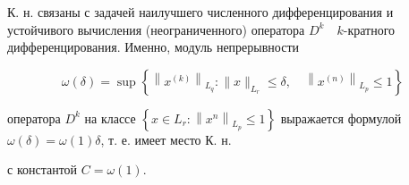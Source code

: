 \documentclass[10pt]{article}
\begin{document}
К. н. связаны с задачей наилучшего численного дифференцирования и устойчивого вычисления (неограниченного) оператора $D^{k} \quad k$-кратного дифференцирования. Именно, модуль непрерывности



\[

\omega(\delta)=\sup \left\{\left\|x^{(k)}\right\|_{L_{q}}:\|x\|_{L_{r}} \leqslant \delta, \quad\left\|x^{(n)}\right\|_{L_{p}} \leqslant 1\right\}

\]



оператора $D^{k}$ на классе $\left\{x \in L_{r}:\left\|x^{n}\right\|_{L_{p}} \leqslant 1\right\}$ выражается формулой $\omega(\delta)=\omega(1) \delta$, т. е. имеет место К. н.

с константой $C=\omega(1)$.
\end{document}
